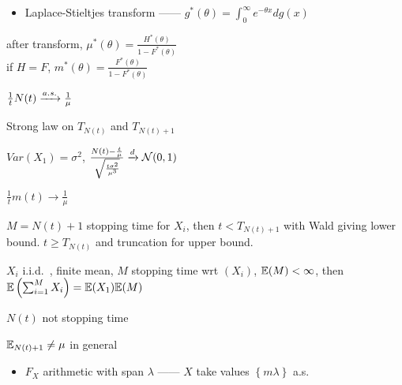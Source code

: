 \begin{itemize}
    \item Laplace-Stieltjes transform ------ $g^*(\theta) = \int_0^\infty e^{-\theta x} dg(x)$
\end{itemize}

\begin{fact}
    after transform, $\mu^*(\theta) = \frac{H^*(\theta)}{1 - F^*(\theta)}$\\
    if $H = F$,  $m^*(\theta) = \frac{F^*(\theta)}{1 - F^*(\theta)}$
\end{fact}

\begin{thm}
    $\frac{1}{t}N(t) \xrightarrow{a.s.} \frac{1}{\mu}$
\end{thm}
\begin{pf}
    Strong law on $T_{N(t)}$ and $T_{N(t) + 1}$
\end{pf}

\begin{thm}
    $Var(X_1) = \sigma^2$, $\frac{N(t) - \frac{t}{\mu}}{\sqrt{\frac{t\sigma^2}{\mu^3}}} \xrightarrow{d} \mathcal{N}(0, 1)$
\end{thm}

\begin{thm}
    $\frac{1}{t}m(t) \rightarrow \frac{1}{\mu}$
\end{thm}
\begin{pf}
    $M = N(t) + 1$ stopping time for $X_i$, then $t < T_{N(t) + 1}$ with Wald giving lower bound.
    $t \geq T_{N(t)}$ and truncation for upper bound.
\end{pf}

\begin{lemma}
    $X_i$ i.i.d.\ , finite mean, $M$ stopping time wrt $(X_i)$, $\mathbb{E}(M) < \infty$, then $\mathbb{E}\left(\sum^M_{i=1} X_i\right) = \mathbb{E}(X_1)\mathbb{E}(M)$
\end{lemma}

\begin{fact}
    $N(t)$ not stopping time
\end{fact}

\begin{fact}
    $\mathbb{E}_{N(t) + 1} \neq \mu$ in general
\end{fact}

\begin{itemize}
    \item $F_X$ arithmetic with span $\lambda$ ------ $X$ take values $\left\{ m\lambda \right\}$ a.s.\
\end{itemize}

